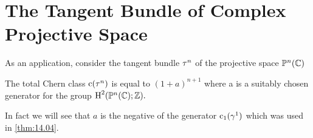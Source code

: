 \documentclass[../main]{subfiles}
\begin{document}
\section{The Tangent Bundle of Complex Projective Space}
As an application, consider the tangent bundle $\tau_{}^n$ of the projective space $\mathbb{P}^{n}(\mathbb{C})$

\begin{theorem}\label{thm:14.10} The total Chern class $\operatorname{c}(\tau_{}^n)$ is equal to $(1+a)^{n+1}$ where a is a suitably chosen generator for the group $\operatorname{H}^{2}(\mathbb{P}^{n}(\mathbb{C}) ; \mathbb{Z}).$

\end{theorem} 

In fact we will see that $a$ is the negative of the generator $\operatorname{c}_{1}(\gamma^{1})$ which was used in \ref{thm:14.04}.
\end{document}
